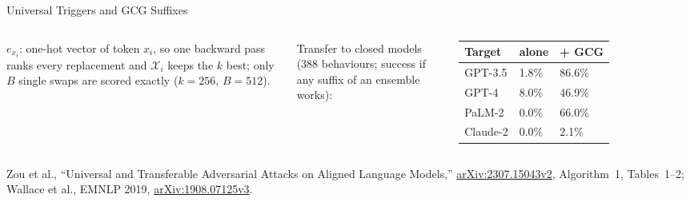 \begin{frame}{Universal Triggers and GCG Suffixes}
\begin{columns}[T,onlytextwidth]
      {\scriptsize $e_{x_i}$: one-hot vector of token $x_i$, so one backward pass ranks every replacement and $\mathcal{X}_i$ keeps the $k$ best; only $B$ single swaps are scored exactly ($k = 256$, $B = 512$).\par}
      \vspace{0.1em}
      {\scriptsize Transfer to closed models (388 behaviours; success if any suffix of an ensemble works):\par}
      {\centering\scriptsize
      \begin{tabular}{p{2.0cm} p{1.4cm} p{1.2cm}}
        \toprule
        \textbf{Target} & \textbf{alone} & \textbf{+ GCG} \\
        \midrule
        GPT-3.5 & 1.8\% & 86.6\% \\
        GPT-4 & 8.0\% & 46.9\% \\
        PaLM-2 & 0.0\% & 66.0\% \\
        Claude-2 & 0.0\% & 2.1\% \\
        \bottomrule
      \end{tabular}\par}
  \end{columns}
  \vspace{0.1em}
  {\scriptsize Zou et al., ``Universal and Transferable Adversarial Attacks on Aligned Language Models,'' \href{https://arxiv.org/abs/2307.15043v2}{arXiv:2307.15043v2}, Algorithm~1, Tables~1--2; Wallace et al., EMNLP 2019, \href{https://arxiv.org/abs/1908.07125v3}{arXiv:1908.07125v3}.\par}
\end{frame}

